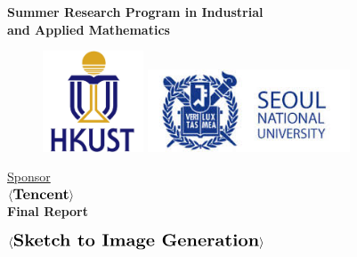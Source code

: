 \thispagestyle{empty}

\def\shiftdowna{0.32in}  %
\def\shiftdownb{0.22in}  %


\begin{center}
\textbf{{\large Summer Research Program in Industrial \\ and Applied Mathematics}}\\

\vspace \shiftdowna

\begin{figure}[h]
  \centering
  \begin{minipage}[b]{0.4\textwidth}
    \centering
    \includegraphics[width=3cm]{Graphics/HKUST_logo.jpg}
      \end{minipage}
  \begin{minipage}[b]{0.4\textwidth}
    \centering
    \includegraphics[width=6cm]{Graphics/snu_logo.jpg}
      \end{minipage}
\end{figure}

\vspace \shiftdowna
\underline {Sponsor}\\ 
\vspace{5pt}
$\langle \textbf{{\large Tencent}} \rangle$ \\
\vspace \shiftdowna
\textbf{Final Report}

\vspace \shiftdowna
$\langle \textbf{{\Large Sketch to Image Generation}}\rangle$



\end{center}
